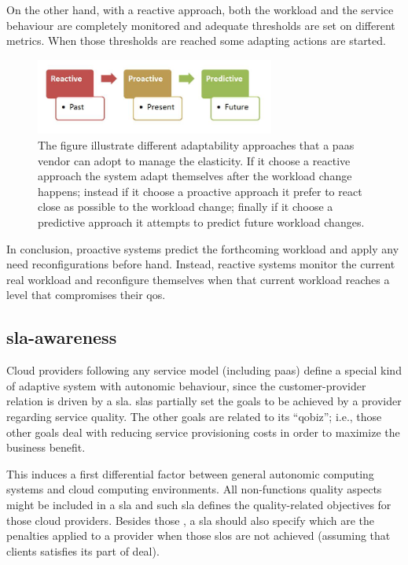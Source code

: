 On the other hand, with a reactive approach, both the workload and the service behaviour are completely
monitored and adequate thresholds are set on different metrics. When those thresholds are reached some
adapting actions are started.

\begin{figure}
	\centering{}
	\includegraphics[width=0.7\textwidth]{chapters/elasticity/images/adaptability.png}
	\caption[Different adaptability approaches]{The figure illustrate different adaptability approaches
		that a \ac{paas} vendor can adopt to manage the elasticity. If it choose a reactive approach the
		system adapt themselves after the workload change happens; instead if it choose a proactive approach
		it prefer to react close as possible to the workload change; finally if it choose a predictive
		approach it attempts to predict future workload changes.}
	\label{img:elasticity-requirements-adaptability}
\end{figure}

In conclusion, proactive systems predict the forthcoming workload and apply any need reconfigurations
before hand. Instead, reactive systems monitor the current real workload and reconfigure themselves
when that current workload reaches a level that compromises their \ac{qos}.

\subsection*{\acs{sla}-awareness}
\label{sec:elasticity-requirements-slaAwareness}
Cloud providers following any service model (including \ac{paas}) define a special kind of adaptive
system with autonomic behaviour, since the customer-provider relation is driven by a \ac{sla}.
\ac{sla}s partially set the goals to be achieved by a provider regarding service quality. The other
goals are related to its ``\ac{qobiz}''; i.e., those other goals deal with reducing service provisioning
costs in order to maximize the business benefit.

This induces a first differential factor between general autonomic computing systems and cloud computing
environments. All non-functions quality aspects might be included in a \ac{sla} and such \ac{sla} 
defines the quality-related objectives for those cloud providers. Besides those , a \ac{sla}
should also specify which are the penalties applied to a provider when those \ac{slo}s are not achieved
(assuming that clients satisfies its part of deal).

